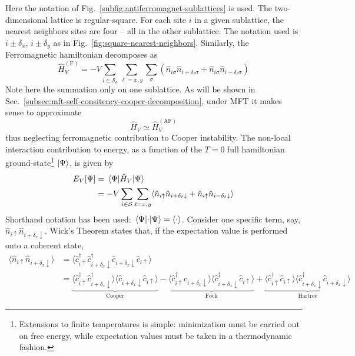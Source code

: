 Here the notation of Fig.~\ref{subfig:antiferromagnet-sublattices} is used. The two-dimensional lattice is regular-square. For each site $i$ in a given sublattice, the nearest neighbors sites are four -- all in the other sublattice. The notation used is $i \pm \delta_x$, $i \pm  \delta_y$ as in Fig.~\ref{fig:square-nearest-neighbors}. Similarly, the Ferromagnetic hamiltonian decomposes as
\[
	\hat H_V^{(\mathrm{F})} = -V \sum_{i \in \mathcal{S}_a} \sum_{\ell = x,y} \sum_\sigma \left(
		\hat n_{i\sigma} \hat n_{i + \delta_\ell \sigma} + \hat n_{i\sigma} \hat n_{i - \delta_\ell \sigma} 
	\right) 
\]
Note here the summation only on one sublattice. As will be shown in Sec.~\ref{subsec:mft-self-consitency-cooper-decomposition}, under MFT it makes sense to approximate
\[
	\hat H_V \simeq \hat{H}_V^{(\mathrm{AF})}
\]
thus neglecting ferromagnetic contribution to Cooper instability. The non-local interaction contribution to energy, as a function of the $T=0$ full hamiltonian ground-state\footnote{
	Extensions to finite temperatures is simple: minimization must be carried out on free energy, while expectation values must be taken in a thermodynamic fashion.
} $\ket{\Psi}$, is given by
\[
\begin{aligned}
	E_V [\Psi] &= \mel{\Psi}{\hat H_V}{\Psi} \\
	&= -V \sum_{i \in \mathcal{S}} \sum_{\ell = x,y} \langle
	\hat n_{i\uparrow} \hat n_{i + \delta_\ell \downarrow} + \hat n_{i\uparrow} \hat n_{i - \delta_\ell \downarrow}
	\rangle 
\end{aligned}
\]
Shorthand notation has been used: $\mel{\Psi}{\cdot}{\Psi} = \langle \cdot \rangle$. Consider one specific term, say, $\hat n_{i\uparrow} \hat n_{i + \delta_x \downarrow}$. Wick's Theorem states that, if the expectation value is performed onto a coherent state,
\[
\begin{aligned}
	\langle 
		\hat n_{i\uparrow} \hat n_{i + \delta_x \downarrow}
	\rangle &= \langle 
		\hat c_{i\uparrow}^\dagger \hat c_{i + \delta_x \downarrow}^\dagger \hat c_{i + \delta_x \downarrow} \hat c_{i\uparrow} 
	\rangle \\
	&= 
	\underbrace{
		\langle 
			\hat c_{i\uparrow}^\dagger \hat c_{i + \delta_x \downarrow}^\dagger
		\rangle \langle	
			\hat c_{i + \delta_x \downarrow} \hat c_{i\uparrow} 
		\rangle 
	}_{\text{Cooper}}
	- 
	\underbrace{
		\langle 
			\hat c_{i\uparrow}^\dagger \hat c_{i + \delta_x \downarrow}
		\rangle \langle	
			\hat c_{i + \delta_x \downarrow}^\dagger \hat c_{i\uparrow} 
		\rangle 
	}_{\text{Fock}}
	+ 
	\underbrace{
		\langle 
			\hat c_{i\uparrow}^\dagger \hat c_{i\uparrow}
		\rangle \langle	
			\hat c_{i + \delta_x \downarrow}^\dagger \hat c_{i + \delta_x \downarrow} 
		\rangle
	}_{\text{Hartree}}
\end{aligned}
\]
